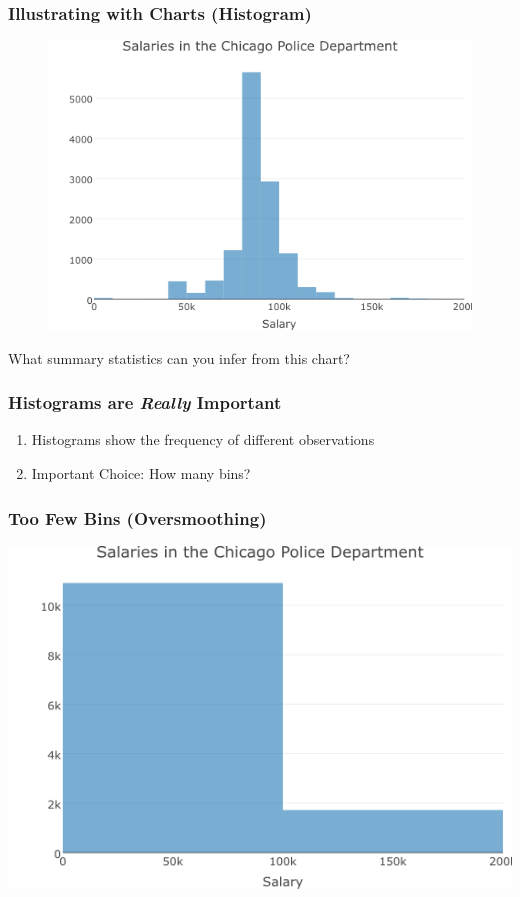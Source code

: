 \documentclass{beamer}
\begin{document}
\begin{frame}
\frametitle{Illustrating with Charts (Histogram)}
	\begin{figure}
		\includegraphics[scale = 0.5]{./images/chicagoHistogram.png}
	\end{figure}
    What summary statistics can you infer from this chart?
\end{frame}

\begin{frame}
\frametitle{Histograms are \emph{Really} Important}
	\begin{enumerate}
		\item Histograms show the frequency of different observations
		\item \alert{Important Choice:} How many bins?
	\end{enumerate}
\end{frame}

\begin{frame}
\frametitle{Too Few Bins (Oversmoothing)}
	\includegraphics[width = \textwidth]{./images/histogramFew.png}
\end{frame}
\end{document}
